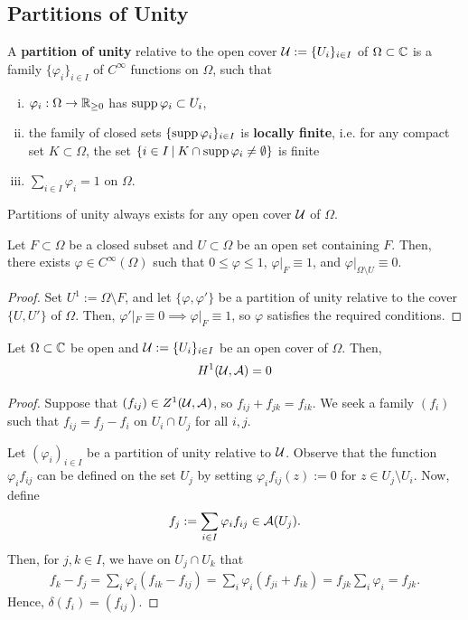 \documentclass[11pt]{article}
\begin{document}
\subsection{Partitions of Unity}

\begin{defn}
    A \textbf{partition of unity} relative to the open cover $\mathcal U:=\{U_i\}_{i \in I}$ of $\Omega \subset \mathbb{C}$ is a family $\{\varphi_i\}_{i \in I}$ of $C^\infty$ functions on $\Omega$, such that
    \begin{enumerate}[(i)]
        \item $\varphi_i:\Omega \to \mathbb{R}_{\geq 0}$ has $\operatorname{supp} \varphi_i \subset U_i$,
        \item the family of closed sets $\{\operatorname{supp} \varphi _i\}_{i \in I}$ is \textbf{locally finite}, i.e. for any compact set $K \subset \Omega$, the set $\left \{ i \in I \: \middle |\: K \cap \operatorname{supp} \varphi_i \neq \emptyset \right \}$ is finite
        \item $\sum_{i \in I}\varphi_i = 1$ on $\Omega$.
    \end{enumerate}
    Partitions of unity always exists for any open cover $\mathcal U$ of $\Omega$.
\end{defn}

\begin{ex}
    Let $F \subset \Omega$ be a closed subset and $U \subset \Omega$ be an open set containing $F$. Then, there exists $\varphi \in C^\infty (\Omega)$ such that $0 \leq \varphi \leq 1$, $\varphi|_F \equiv 1$, and $\varphi|_{\Omega \setminus U}\equiv 0$.
\end{ex}

\begin{proof}
    Set $U^1 := \Omega \setminus F$, and let $\{\varphi, \varphi'\}$ be a partition of unity relative to the cover $\{U,U'\}$ of $\Omega$. Then, $\varphi'|_F \equiv 0 \implies \varphi|_F \equiv 1$, so $\varphi$ satisfies the required conditions.
\end{proof}

\begin{thm}
    Let $\Omega \subset \mathbb{C}$ be open and $\mathcal U := \{U_i\}_{i \in I}$ be an open cover of $\Omega$. Then,
    \[
    H^1(\mathcal U,\mathcal A)=0
    \]
\end{thm}

\begin{proof}
    Suppose that $(f_{ij})\in Z^1(\mathcal U, \mathcal A)$, so $f_{ij}+ f_{jk}=f_{ik}$. We seek a family $(f_i)$ such that $f_{ij}=f_j-f_i$ on $U_i \cap U_j$ for all $i,j$.

    Let $(\varphi _i)_{i \in I}$ be a partition of unity relative to $\mathcal U$. Observe that the function $\varphi_if_{ij}$ can be defined on the set $U_j$ by setting $\varphi_if_{ij}(z):=0$ for $z \in U_j \setminus U_i$. Now, define
    \[
    f_j := \sum_{i \in I}\varphi_i f_{ij} \in \mathcal A(U_j).
    \]
    Then, for $j,k \in I$, we have on $U_j \cap U_k$ that
    \begin{align*}
        f_k-f_j = \sum_{i} \varphi_i(f_{ik}-f_{ij}) = \sum_{i}\varphi_i (f_{ji} + f_{ik})=f_{jk}\sum_i \varphi_i = f_{jk}.
    \end{align*}
    Hence, $\delta (f_i) = (f_{ij})$.
\end{proof}
\end{document}
